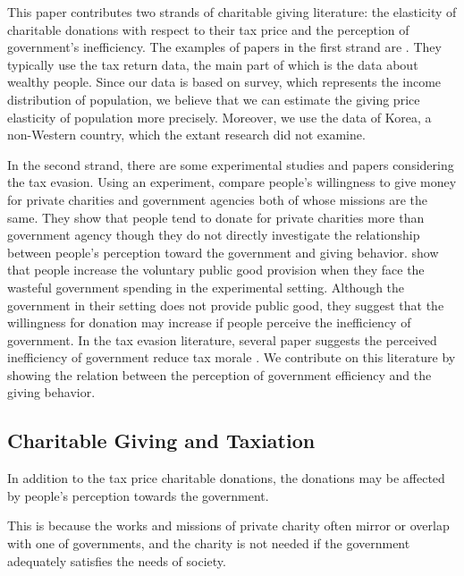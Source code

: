 \documentclass[ review  , 3p ]{elsarticle}
\begin{document}
  This paper contributes two strands of charitable giving literature: the elasticity of charitable donations with respect to their tax price and the perception of government's inefficiency. The examples of papers in the first strand are \cite{Randolph1995, Auten2002, Fack2010, Bakija2011, Almunia2020}. They typically use the tax return data, the main part of which is the data about wealthy people. Since our data is based on survey, which represents the income distribution of population, we believe that we can estimate the giving price elasticity of population more precisely. Moreover, we use the data of Korea, a non-Western country, which the extant research did not examine.
  
  In the second strand, there are some experimental studies and papers considering the tax evasion. Using an experiment, \cite{Li2011} compare people's willingness to give money for private charities and government agencies both of whose missions are the same. They show that people tend to donate for private charities more than government agency though they do not directly investigate the relationship between people's perception toward the government and giving behavior. \cite{Sheremeta2020} show that people increase the voluntary public good provision when they face the wasteful government spending in the experimental setting. Although the government in their setting does not provide public good, they suggest that the willingness for donation may increase if people perceive the inefficiency of government. In the tax evasion literature, several paper suggests the perceived inefficiency of government reduce tax morale \citep{Frey2007, Hammar2009, Anderson2017}. We contribute on this literature by showing the relation between the perception of government efficiency and the giving behavior.
  
  \hypertarget{charitable-giving-and-taxiation-1}{%
  \subsection{Charitable Giving and Taxiation}\label{charitable-giving-and-taxiation-1}}
  
  In addition to the tax price charitable donations, the donations may be affected by people's perception towards the government.
  
  This is because the works and missions of private charity often mirror or overlap with one of governments, and the charity is not needed if the government adequately satisfies the needs of society.
  
\end{document}
